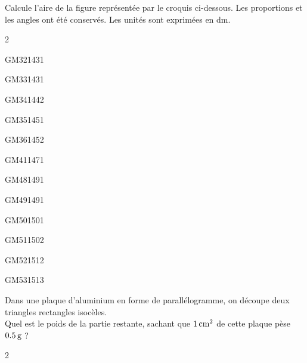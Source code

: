 \documentclass[a4paper,11pt]{report}
\let\oldcenter\center
\let\oldendcenter\endcenter
\renewenvironment{center}{\setlength\topsep{-10pt}\oldcenter}{\oldendcenter}
\begin{document}
\begin{exo}{
Calcule l'aire de la figure représentée par le croquis ci-dessous. Les proportions et les angles ont été conservés. Les unités sont exprimées en dm.
\begin{center}
    
\end{center}
}{2}
\end{exo}


\begin{exol}{GM32}{143}{1}      %
\end{exol}
\begin{exol}{GM33}{143}{1}      %
\end{exol}
\begin{exol}{GM34}{144}{2}      %
\end{exol}
\begin{exol}{GM35}{145}{1}      %
\end{exol}
\begin{exol}{GM36}{145}{2}      %
\end{exol}
\begin{exol}{GM41}{147}{1}      %
\end{exol}
\begin{exol}{GM48}{149}{1}      %
\end{exol}  
\begin{exol}{GM49}{149}{1}      %
\end{exol}
\begin{exol}{GM50}{150}{1}      %
\end{exol}
\begin{exol}{GM51}{150}{2}
\end{exol}
\begin{exol}{GM52}{151}{2}
\end{exol}
\begin{exol}{GM53}{151}{3}
\end{exol}


\begin{exo}{
		Dans une plaque d'aluminium en forme de parallélogramme, on découpe deux triangles rectangles isocèles. \\ Quel est le poids de la partie restante, sachant que $\tunit{1}{cm^2}$ de cette plaque pèse $\tunit{0,5}{g}$ ? \\
\begin{center}
\end{center}
}{2}
\end{exo}
\end{document}
